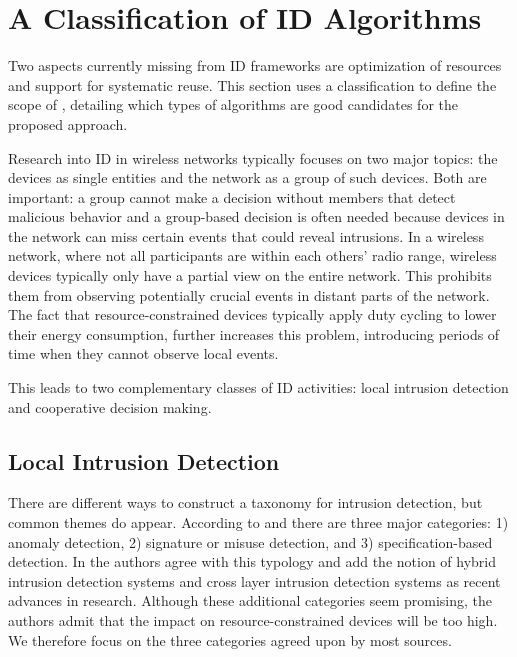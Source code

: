 \documentclass[3p,times,procedia]{elsarticle}
\begin{document}
\section{A Classification of ID Algorithms}
\label{classification}

Two aspects currently missing from ID frameworks are optimization of resources
and support for systematic reuse. This section uses a classification to define
the scope of \NAME, detailing which types of algorithms are good candidates for
the proposed approach.

Research into ID in wireless networks typically focuses on two major topics:
the devices as single entities and the network as a group of such devices. Both
are important: a group cannot make a decision without members that detect
malicious behavior and a group-based decision is often needed because devices
in the network can miss certain events that could reveal intrusions. In a
wireless network, where not all participants are within each others' radio
range, wireless devices typically only have a partial view on the entire
network. This prohibits them from observing potentially crucial events in
distant parts of the network. The fact that resource-constrained devices
typically apply duty cycling to lower their energy consumption, further
increases this problem, introducing periods of time when they cannot observe
local events.

This leads to two complementary classes of ID activities: local intrusion
detection and cooperative decision making.

\subsection{Local Intrusion Detection}
\label{detection}

There are different ways to construct a taxonomy for intrusion detection, but
common themes do appear. According to \cite{mishra2004intrusion} and
\cite{ioannis2007towards} there are three major categories: 1) anomaly
detection, 2) signature or misuse detection, and 3) specification-based
detection. In \cite{alrajeh2013intrusion} the authors agree with this typology
and add the notion of hybrid intrusion detection systems and cross layer
intrusion detection systems as recent advances in research. Although these
additional categories seem promising, the authors admit that the impact on
resource-constrained devices will be too high. We therefore focus on the three
categories agreed upon by most sources.
\end{document}
